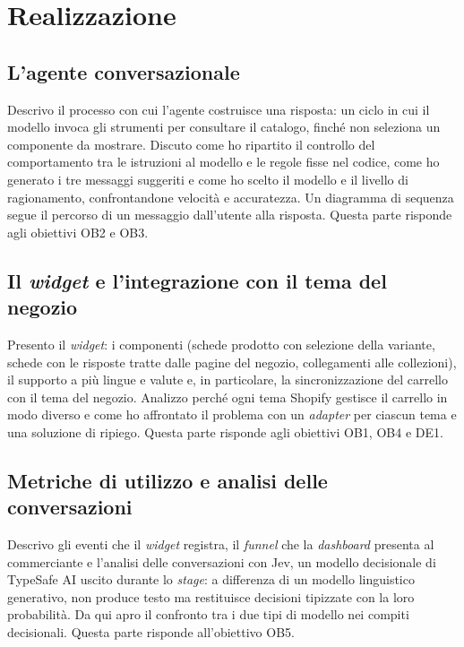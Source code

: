 
\section{Realizzazione}

\subsection{L’agente conversazionale}

Descrivo il processo con cui l’agente costruisce una risposta: un ciclo in cui il modello invoca gli
strumenti per consultare il catalogo, finché non seleziona un componente da mostrare. Discuto come
ho ripartito il controllo del comportamento tra le istruzioni al modello e le regole fisse nel
codice, come ho generato i tre messaggi suggeriti e come ho scelto il modello e il livello di
ragionamento, confrontandone velocità e accuratezza. Un diagramma di sequenza segue il percorso di
un messaggio dall’utente alla risposta. Questa parte risponde agli obiettivi OB2 e OB3.

\subsection{Il \emph{widget} e l’integrazione con il tema del negozio}

Presento il \emph{widget}: i componenti (schede prodotto con selezione della variante, schede con le
risposte tratte dalle pagine del negozio, collegamenti alle collezioni), il supporto a più lingue e
valute e, in particolare, la sincronizzazione del carrello con il tema del negozio. Analizzo perché
ogni tema Shopify gestisce il carrello in modo diverso e come ho affrontato il problema con un
\emph{adapter} per ciascun tema e una soluzione di ripiego. Questa parte risponde agli obiettivi
OB1, OB4 e DE1.

\subsection{Metriche di utilizzo e analisi delle conversazioni}

Descrivo gli eventi che il \emph{widget} registra, il \emph{funnel} che la \emph{dashboard} presenta
al commerciante e l’analisi delle conversazioni con Jev, un modello decisionale di TypeSafe AI
uscito durante lo \emph{stage}: a differenza di un modello linguistico generativo, non produce testo
ma restituisce decisioni tipizzate con la loro probabilità. Da qui apro il confronto tra i due tipi
di modello nei compiti decisionali. Questa parte risponde all’obiettivo OB5.
